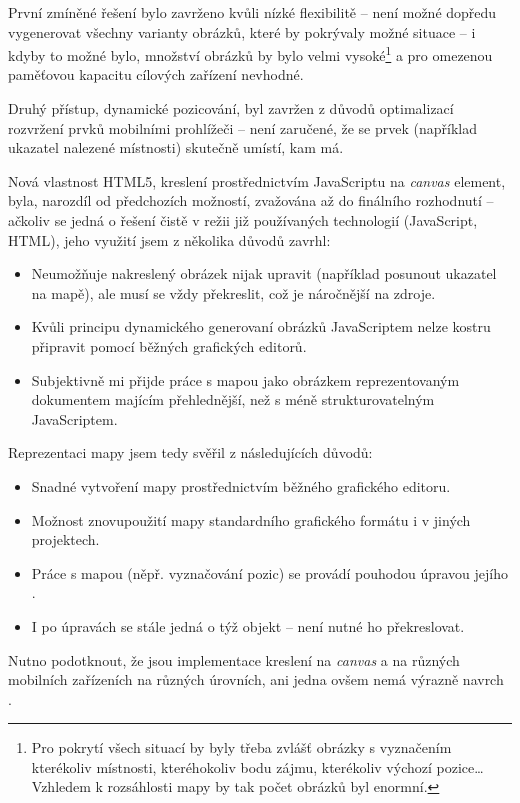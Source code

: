 První zmíněné řešení bylo zavrženo kvůli nízké flexibilitě -- není možné dopředu vygenerovat všechny varianty obrázků, které by pokrývaly možné situace -- i kdyby to možné bylo, množství obrázků by bylo velmi vysoké\footnote{Pro pokrytí všech situací by byly třeba zvlášť obrázky s vyznačením kterékoliv místnosti, kteréhokoliv bodu zájmu, kterékoliv výchozí pozice\dots Vzhledem k rozsáhlosti mapy by tak počet obrázků byl enormní.} a pro omezenou paměťovou kapacitu cílových zařízení nevhodné.

Druhý přístup, dynamické pozicování, byl zavržen z důvodů optimalizací rozvržení prvků mobilními prohlížeči -- není zaručené, že se prvek (například ukazatel nalezené místnosti) skutečně umístí, kam má.

Nová vlastnost HTML5, kreslení prostřednictvím JavaScriptu na \textit{canvas} element, byla, narozdíl od předchozích možností, zvažována až do finálního rozhodnutí -- ačkoliv se jedná o řešení čistě v režii již používaných technologií (JavaScript, HTML), jeho využití jsem z několika důvodů zavrhl:
\begin{itemize}
 \item Neumožňuje nakreslený obrázek nijak upravit (například posunout ukazatel na mapě), ale musí se vždy překreslit, což je náročnější na zdroje.
 \item Kvůli principu dynamického generovaní obrázků JavaScriptem nelze kostru připravit pomocí běžných grafických editorů.
 \item Subjektivně mi přijde práce s mapou jako  obrázkem reprezentovaným  dokumentem majícím  přehlednější, než s méně strukturovatelným JavaScriptem.
\end{itemize}

Reprezentaci mapy jsem tedy svěřil  z následujících důvodů:
\begin{itemize}
 \item Snadné vytvoření mapy prostřednictvím běžného grafického editoru.
 \item Možnost znovupoužití mapy standardního grafického formátu i v jiných projektech.
 \item Práce s mapou (něpř. vyznačování pozic) se provádí pouhodou úpravou jejího .
 \item I po úpravách se stále jedná o týž objekt -- není nutné ho překreslovat.
\end{itemize}

Nutno podotknout, že jsou implementace kreslení na \textit{canvas} a  na různých mobilních zařízeních na různých úrovních, ani jedna ovšem nemá výrazně navrch \cite{CanIUse} \cite{MobileHtml}.

